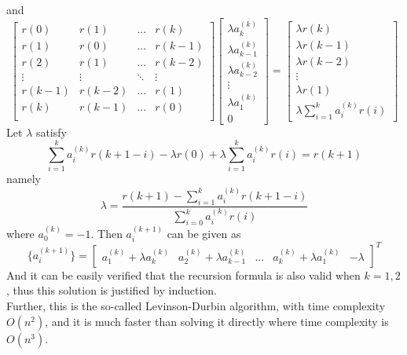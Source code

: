 \documentclass[preprint,12pt]{elsarticle}
\begin{document}
and
\begin{equation}
	\begin{bmatrix}
		r(0) & r(1) & ... & r(k)\\ 
		r(1) & r(0) & ... & r(k-1)\\
		r(2) & r(1) & ... & r(k-2)\\
		\vdots & \vdots & \ddots & \vdots \\
		r(k-1) & r(k-2) & ... & r(1)\\
		r(k) & r(k-1) & ... & r(0)\\
	\end{bmatrix}
	\begin{bmatrix}
		\lambda a_k^{(k)} \\
		\lambda a_{k-1}^{(k)} \\
		\lambda a_{k-2}^{(k)} \\
		\vdots \\
		\lambda a_1^{(k)} \\
		0
	\end{bmatrix}
	=
	\begin{bmatrix}
		\lambda r(k) \\
		\lambda r(k-1) \\
		\lambda r(k-2) \\
		\vdots \\
		\lambda r(1) \\
		\lambda\sum_{i=1}^{k}a_i^{(k)} r(i)
	\end{bmatrix}
\end{equation}
Let $\lambda$ satisfy
\begin{equation}
	\sum_{i=1}^{k}a_i^{(k)} r(k+1-i)-\lambda r(0) + \lambda\sum_{i=1}^{k}a_i^{(k)} r(i) = r(k+1)
\end{equation}
namely
\begin{equation}
	\lambda = \frac{r(k+1) - \sum_{i=1}^{k}a_i^{(k)} r(k+1-i)}{\sum_{i=0}^{k}a_i^{(k)}r(i)}
\end{equation}
where $a_0^{(k)} = -1$. Then $a_i^{(k+1)}$ can be given as
\begin{equation}
	\{a_i^{(k+1)}\} = 
	\begin{bmatrix}
		a_1^{(k)} + \lambda a_k^{(k)} & a_2^{(k)} + \lambda a_{k-1}^{(k)} & ... & a_k^{(k)} + \lambda a_1^{(k)} & -\lambda  
	\end{bmatrix}^T
\end{equation}
And it can be easily verified that the recursion formula is also valid when $k=1,2$, thus this solution is justified by induction. \\
Further, this is the so-called Levinson-Durbin algorithm, with time complexity $O(n^2)$, and it is much faster than solving it directly where time complexity is $O(n^3)$.
\end{document}

